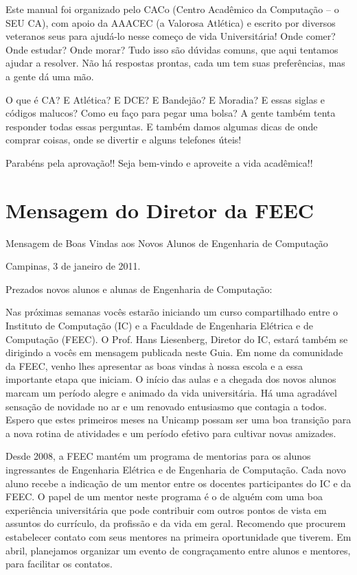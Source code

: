 \documentclass[a4paper,10pt, twocolumn]{article}
\begin{document}
Este manual foi organizado pelo CACo (Centro Acadêmico da Computação -- o SEU
CA), com apoio da AAACEC (a Valorosa Atlética) e escrito por diversos veteranos
seus para ajudá-lo nesse começo de vida Universitária! Onde comer? Onde estudar?
Onde morar? Tudo isso são dúvidas comuns, que aqui tentamos ajudar a resolver.
Não há respostas prontas, cada um tem suas preferências, mas a gente dá uma mão.

O que é CA? E Atlética? E DCE? E Bandejão? E Moradia? E essas siglas e códigos
malucos? Como eu faço para pegar uma bolsa? A gente também tenta responder todas
essas perguntas. E também damos algumas dicas de onde comprar coisas, onde se
divertir e alguns telefones úteis!

Parabéns pela aprovação!! Seja bem-vindo e aproveite a vida acadêmica!!

\section{Mensagem do Diretor da FEEC}
Mensagem de Boas Vindas aos Novos Alunos de Engenharia de Computação

Campinas, 3 de janeiro de 2011.

Prezados novos alunos e alunas de Engenharia de Computação:

Nas próximas semanas vocês estarão iniciando um curso compartilhado entre
o Instituto de Computação (IC) e a Faculdade de Engenharia Elétrica e de
Computação (FEEC). O Prof. Hans Liesenberg, Diretor do IC, estará também se
dirigindo a vocês em mensagem publicada neste Guia. Em nome da comunidade da
FEEC, venho lhes apresentar as boas vindas à nossa escola e a essa importante
etapa que iniciam. O início das aulas e a chegada dos novos alunos marcam um
período alegre e animado da vida universitária. Há uma agradável sensação de
novidade no ar e um renovado entusiasmo que contagia a todos. Espero que estes
primeiros meses na Unicamp possam ser uma boa transição para a nova rotina de
atividades e um período efetivo para cultivar novas amizades.

Desde 2008, a FEEC mantém um programa de mentorias para os alunos ingressantes
de Engenharia Elétrica e de Engenharia de Computação. Cada novo aluno recebe
a indicação de um mentor entre os docentes participantes do IC e da FEEC.
O papel de um mentor neste programa é o de alguém com uma boa experiência
universitária que pode contribuir com outros pontos de vista em assuntos do
currículo, da profissão e da vida em geral. Recomendo que procurem estabelecer
contato com seus mentores na primeira oportunidade que tiverem. Em abril,
planejamos organizar um evento de congraçamento entre alunos e mentores, para
facilitar os contatos.
\end{document}
